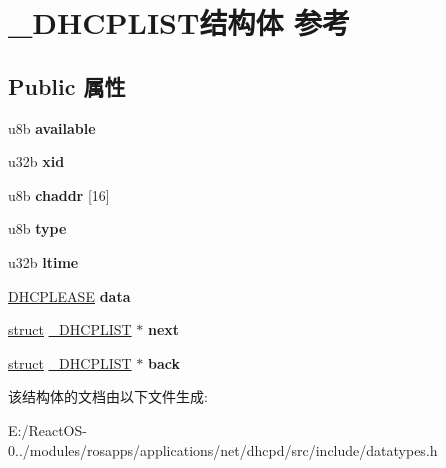 \hypertarget{struct___d_h_c_p_l_i_s_t}{}\section{\+\_\+\+D\+H\+C\+P\+L\+I\+S\+T结构体 参考}
\label{struct___d_h_c_p_l_i_s_t}
\subsection*{Public 属性}
\begin{DoxyCompactItemize}
\item 
\mbox{\label{struct___d_h_c_p_l_i_s_t_aa6c0a81e5f3778449da6cd6d5495a521}} 
u8b {\bfseries available}
\item 
\mbox{\label{struct___d_h_c_p_l_i_s_t_a7853ed7df2d06e52070c6be48e49bd19}} 
u32b {\bfseries xid}
\item 
\mbox{\label{struct___d_h_c_p_l_i_s_t_aff0a3c4a843db24238d800ca779bb498}} 
u8b {\bfseries chaddr} \mbox{[}16\mbox{]}
\item 
\mbox{\label{struct___d_h_c_p_l_i_s_t_a4382962dde770788971ce86e455c65c1}} 
u8b {\bfseries type}
\item 
\mbox{\label{struct___d_h_c_p_l_i_s_t_ae4950b478456cd741ce866f1f38e51fc}} 
u32b {\bfseries ltime}
\item 
\mbox{\label{struct___d_h_c_p_l_i_s_t_a2f1d1897c8dfaa658e19cdc8403921bf}} 
\hyperlink{struct_d_h_c_p_l_e_a_s_e}{D\+H\+C\+P\+L\+E\+A\+SE} {\bfseries data}
\item 
\mbox{\label{struct___d_h_c_p_l_i_s_t_a415a713336651cd75f1a3c03c045430e}} 
\hyperlink{interfacestruct}{struct} \hyperlink{struct___d_h_c_p_l_i_s_t}{\+\_\+\+D\+H\+C\+P\+L\+I\+ST} $\ast$ {\bfseries next}
\item 
\mbox{\label{struct___d_h_c_p_l_i_s_t_a2a72b3d281542db2b0eb21fa159e7a9b}} 
\hyperlink{interfacestruct}{struct} \hyperlink{struct___d_h_c_p_l_i_s_t}{\+\_\+\+D\+H\+C\+P\+L\+I\+ST} $\ast$ {\bfseries back}
\end{DoxyCompactItemize}


该结构体的文档由以下文件生成\+:\begin{DoxyCompactItemize}
\item 
E\+:/\+React\+O\+S-\/0../modules/rosapps/applications/net/dhcpd/src/include/datatypes.\+h\end{DoxyCompactItemize}

